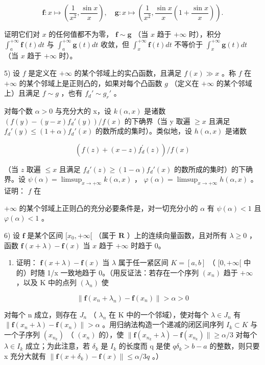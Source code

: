 \[
\mathbf {f}: x \mapsto \left(\frac {1}{x ^ {2}}, \frac {\sin x}{x}\right), \quad \mathbf {g}: x \mapsto \left(\frac {1}{x ^ {2}}, \frac {\sin x}{x} \left(1 + \frac {\sin x}{x}\right)\right).
\]

证明它们对 \(x\) 的任何值都不为零， \(\mathbf{f} \sim \mathbf{g}\) （当 \(x\) 趋于 \(+\infty\) 时），积分 \(\int_{a}^{+\infty} \mathbf{f}(t) dt\) 与 \(\int_{a}^{+\infty} \mathbf{g}(t) dt\) 收敛，但 \(\int_{x}^{+\infty} \mathbf{f}(t) dt\) 不等价于 \(\int_{x}^{+\infty} \mathbf{g}(t) dt\) （当 \(x\) 趋于 \(+\infty\) 时）。

5) 设 \(f\) 是定义在 \(+\infty\) 的某个邻域上的实凸函数，且满足 \(f(x) \gg x\) 。称 \(f\) 在 \(+\infty\) 的某个邻域上是正则凸的，如果对每个凸函数 \(g\) （定义在 \(+\infty\) 的某个邻域上）且满足 \(f \sim g\) ，也有 \(f_d' \sim g_r'\) 。

对每个数 \(\alpha > 0\) 与充分大的 x，设 \(k(\alpha, x)\) 是诸数 \(\left(f(y) - (y - x)f_{d}'(y)\right)/f(x)\) 的下确界（当 y 取遍 \(\geqslant x\) 且满足 \(f_{d}'(y) \leqslant (1 + \alpha)f_{d}'(x)\) 的数所成的集时）。类似地，设 \(h(\alpha, x)\) 是诸数

\[
\left(f (z) + (x - z) f _ {d} ^ {\prime} (z)\right) / f (x)
\]

（当 \(z\) 取遍 \(\leqslant x\) 且满足 \(f_d'(z) \geqslant (1 - \alpha)f_d'(x)\) 的数所成的集时）的下确界。设 \(\psi(\alpha) = \limsup_{x \to +\infty} k(\alpha, x)\) ， \(\varphi(\alpha) = \limsup_{x \to +\infty} h(\alpha, x)\) 。证明： \(f\) 在

\(+\infty\) 的某个邻域上正则凸的充分必要条件是，对一切充分小的 \(\alpha\) 有 \(\psi(\alpha) < 1\) 且 \(\varphi(\alpha) < 1\) 。

6) 设 \(\mathbf{f}\) 是某个区间 \([x_0, +\infty[\) （属于 \(\mathbf{R}\) ）上的连续向量函数，且对所有 \(\lambda \geqslant 0\) ，函数 \(\mathbf{f}(x + \lambda) - \mathbf{f}(x)\) 当 \(x\) 趋于 \(+\infty\) 时趋于 0。

\begin{enumerate}
\def\labelenumi{\alph{enumi})}
\tightlist
\item
  证明： \(\mathbf{f}(x+\lambda)-\mathbf{f}(x)\) 当 \(\lambda\) 属于任一紧区间 \(K=[a,b]\) （ \([0,+\infty[\) 中的）时随 1/x 一致地趋于 0。（用反证法：若存在一个序列 \((x_{n})\) 趋于 \(+\infty\) ，以及 K 中的点列 \((\lambda_{n})\) 使
\end{enumerate}

\[
\| \mathbf {f} (x _ {n} + \lambda_ {n}) - \mathbf {f} (x _ {n}) \| > \alpha > 0
\]

对每个 n 成立，则存在 \(J_{n}\) （ \(\lambda_{n}\) 在 K 中的一个邻域），使对每个 \(\lambda \in J_{n}\) 有 \(\|\mathbf{f}(x_{n} + \lambda) - \mathbf{f}(x_{n})\| > \alpha\) 。用归纳法构造一个递减的闭区间序列 \(I_{k} \subset K\) 与一个子序列 \((x_{n_{k}})\) （ \((x_{n})\) 的），使 \(\|\mathbf{f}(x_{n_{k}} + \lambda) - \mathbf{f}(x_{n_{k}})\| \geqslant \alpha/3\) 对每个 \(\lambda \in I_{k}\) 成立；为此注意，若 \(\delta_{k}\) 是 \(I_{k}\) 的长度而 q 是使 \(q\delta_{k} > b - a\) 的整数，则只要 x 充分大就有 \(\|\mathbf{f}(x + \delta_{k}) - \mathbf{f}(x)\| \leqslant \alpha/3q\) 。）

